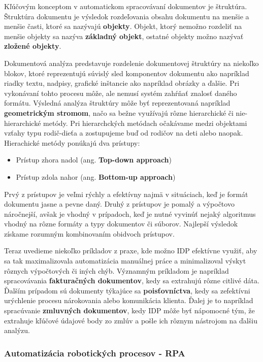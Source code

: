 \documentclass[twoside,slovak, a4paper]{article}
\begin{document}
Kľúčovým konceptom v automatickom spracovávaní dokumentov je štruktúra. Štruktúra dokumentu je výsledok rozdeľovania obsahu dokumentu na menšie a menšie časti, ktoré sa nazývajú \textbf{objekty}. Objekt, ktorý nemožno rozdeliť na menšie objekty sa nazýva \textbf{základný objekt}, ostatné objekty možno nazývať \textbf{zložené objekty}\cite{TANG19961931}.  

Dokumentová analýza predstavuje rozdelenie dokumentovej štruktúry na niekoľko blokov, ktoré reprezentujú súvislý sled komponentov dokumentu ako napríklad riadky textu, nadpisy, grafické inštancie ako napríklad obrázky a ďalšie. Pri vykonávaní tohto procesu môže, ale nemusí systém zahŕňať znalosť daného formátu. Výsledná analýza štruktúry môže byť reprezentovaná napríklad \textbf{geometrickým stromom}, načo sa bežne využívajú rôzne hierarchické či nie-hierarchické metódy. Pri hierarchckých metódach očakávame medzi objektami vzťahy typu rodič-dieťa a zostupujeme buď od rodičov na deti alebo  naopak\cite{TANG19961931}. Hierachické metódy ponúkajú dva prístupy:

\begin{itemize}
    \item Prístup zhora nadol (ang. \textbf{Top-down approach})
    \item Prístup zdola nahor (ang. \textbf{Bottom-up approach})
\end{itemize}

Prvý z prístupov je veľmi rýchly a efektívny najmä v situáciach, keď je formát dokumentu jasne a pevne daný. Druhý z prístupov je pomalý a výpočtovo náročnejší, avšak je vhodný v prípadoch, keď je nutné vyvinúť nejaký algoritmus vhodný na rôzne formáty a typy dokumentov či súborov. Najlepší výsledok získame rozumným kombinovaním obidvoch prístupov\cite{TANG19961931}.

Teraz uvedieme niekoľko príkladov z praxe, kde možno IDP efektívne využiť, aby sa tak maximalizovala automatizácia manuálnej práce a minimalizoval výskyt rôznych výpočtových či iných chýb. Významným príkladom je napríklad spracovávania \textbf{fakturačných dokumentov}, kedy sa extrahujú rôzne citlivé dáta. Ďalším prípadom sú dokumenty týkajúce sa \textbf{poisťovníctva}, kedy sa zefektívni urýchlenie procesu nárokovania alebo komunikácia klienta. Ďalej je to napríklad spracúvanie \textbf{zmluvných dokumentov}, kedy IDP môže byť nápomocné tým, že extrahuje kľúčové údajové body zo zmlúv a pošle ich rôznym nástrojom na ďalšiu analýzu\cite{AH:WAS}.


\subsubsection{Automatizácia robotických procesov - RPA}
\end{document}
